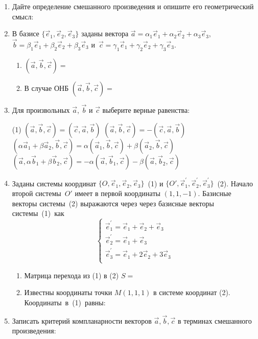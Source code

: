 \begin{enumerate}
	\item Дайте определение смешанного произведения и опишите его геометрический смысл:\ \hrulefill\par\hrulefill
    
    \item В базисе $\{\vec e_1, \vec e_2, \vec e_3\}$ заданы вектора $\vec a = \alpha_1 \vec e_1 + \alpha_2 \vec e_2 + \alpha_3 \vec e_3$, $\vec b = \beta_1 \vec e_1 + \beta_2 \vec e_2 + \beta_3 \vec e_3$ и~$\vec c = \gamma_1 \vec e_1 + \gamma_2 \vec e_2 + \gamma_3 \vec e_3$.
  
    \begin{enumerate}[topsep=0.5cm, itemsep=1cm]
        \item $(\vec a, \vec b, \vec c)= $
        \item В случае ОНБ $(\vec a, \vec b, \vec c)= $
    \end{enumerate}
    
    \item Для произвольных $\vec a$, $\vec b$ и $\vec c$ выберите верные равенства:
    \begin{tasks}(1)
        \task $(\vec a, \vec b, \vec c)= (\vec c, \vec a, \vec b)$
        \task $(\vec a, \vec b, \vec c)= -(\vec c, \vec a, \vec b)$ 
        \task $(\alpha \vec a_1 + \beta \vec a_2, \vec b, \vec c)= \alpha(\vec a_1, \vec b, \vec c) + \beta (\vec a_2, \vec b, \vec c)$
        \task $(\vec a, \alpha \vec b_1 + \beta \vec b_2,  \vec c)= -\alpha(\vec a, \vec b_1, \vec c) - \beta (\vec a, \vec b_2, \vec c)$
    \end{tasks}
    
    \item Заданы системы координат $\{O, \vec e_1, \vec e_2, \vec e_3\}$~(1) и $\{O', \vec e_1^\prime, \vec e_2^\prime, \vec e_3^\prime\}$~(2). Начало второй системы~$O'$ имеет в первой координаты $(1, 1, -1)$.  Базисные векторы системы~(2) выражаются через через базисные векторы системы~(1)~как 
     \begin{equation*}
      \begin{cases}
        \vec e_1^\prime =  \vec e_1 +  \vec e_2 +  \vec e_3 \\
        \vec e_2^\prime =  \vec e_1 +   \vec e_3 \\
        \vec e_3^\prime =  \vec e_1 + 2 \vec e_2 + 3 \vec e_3\\
     \end{cases}
    \end{equation*}
    \begin{enumerate}[topsep=0.5cm, itemsep=1cm]
        \item Матрица перехода из (1) в (2) $S = $
        \item Известны координаты точки $M(1, 1, 1)$ в системе координат (2). Координаты~в~(1)~равны:\vspace{1cm}  
     \end{enumerate}
     
   \item Записать критерий компланарности векторов $\vec a, \vec b, \vec c$ в терминах смешанного произведения: \hrulefill\par\hrulefill

\end{enumerate}